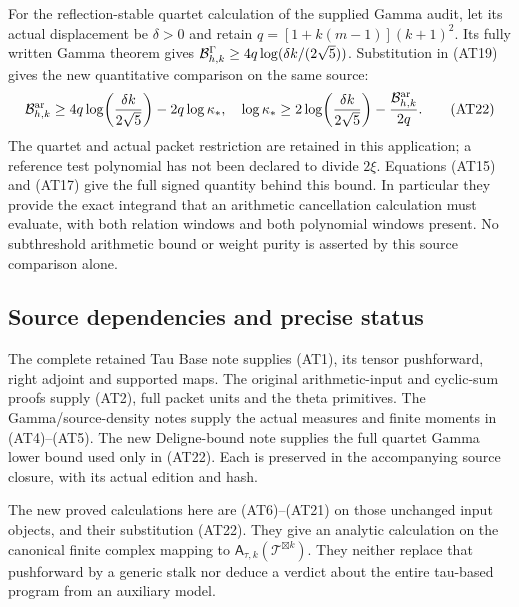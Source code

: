 For the reflection-stable quartet calculation of the supplied
Gamma audit, let its actual displacement be $\delta>0$ and
retain $q=[1+k(m-1)](k+1)^2$. Its fully written Gamma theorem
gives $\mathcal B^\Gamma_{h,k}\ge
4q\log(\delta k/(2\sqrt5))$. Substitution in (AT19) gives the
new quantitative comparison on the same source:
\[
 \mathcal B^{\mathrm{ar}}_{h,k}\ge
 4q\log\!\left(\frac{\delta k}{2\sqrt5}\right)-2q\log\kappa_*,
 \quad
 \log\kappa_*\ge
 2\log\!\left(\frac{\delta k}{2\sqrt5}\right)
       -\frac{\mathcal B^{\mathrm{ar}}_{h,k}}{2q}.                   \tag{AT22}
\]
The quartet and actual packet restriction are retained in this
application; a reference test polynomial has not been declared
to divide $2\xi$. Equations (AT15) and (AT17) give the full
signed quantity behind this bound. In particular they provide
the exact integrand that an arithmetic cancellation calculation
must evaluate, with both relation windows and both polynomial
windows present. No subthreshold arithmetic bound or weight
purity is asserted by this source comparison alone.

\subsection{Source dependencies and precise status}

The complete retained Tau Base note supplies (AT1), its tensor
pushforward, right adjoint and supported maps. The original
arithmetic-input and cyclic-sum proofs supply (AT2), full packet
units and the theta primitives. The Gamma/source-density notes
supply the actual measures and finite moments in (AT4)--(AT5).
The new Deligne-bound note supplies the full quartet Gamma
lower bound used only in (AT22). Each is preserved in the
accompanying source closure, with its actual edition and hash.

The new proved calculations here are (AT6)--(AT21) on those
unchanged input objects, and their substitution (AT22). They
give an analytic calculation on the canonical finite complex
mapping to $\mathsf A_{\tau,k}(\mathcal T^{\boxtimes k})$.
They neither replace that pushforward by a generic stalk nor
deduce a verdict about the entire tau-based program from an
auxiliary model.

\endgroup
